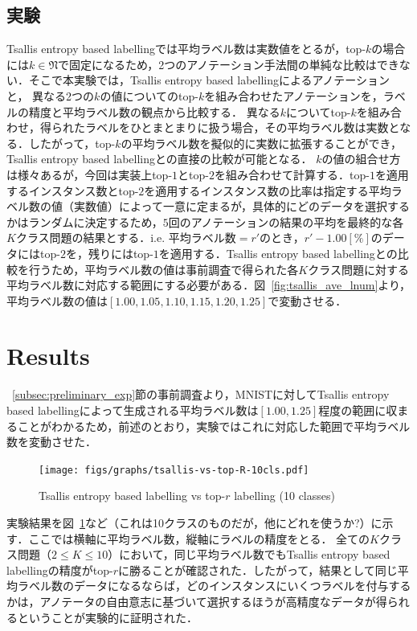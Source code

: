 \documentclass[a4paper,conference]{IEEEtran}
\begin{document}
\subsection{実験}\label{subsec:experiment}
Tsallis entropy based labellingでは平均ラベル数は実数値をとるが，top-$k$の場合には$k \in \mathfrak{N}$で固定になるため，2つのアノテーション手法間の単純な比較はできない．そこで本実験では，Tsallis entropy based labellingによるアノテーションと，
異なる2つの$k$の値についてのtop-$k$を組み合わせたアノテーションを，ラベルの精度と平均ラベル数の観点から比較する．
異なる$k$についてtop-$k$を組み合わせ，得られたラベルをひとまとまりに扱う場合，その平均ラベル数は実数となる．したがって，top-$k$の平均ラベル数を擬似的に実数に拡張することができ，Tsallis entropy based labellingとの直接の比較が可能となる．
$k$の値の組合せ方は様々あるが，今回は実装上top-$1$とtop-$2$を組み合わせて計算する．top-$1$を適用するインスタンス数とtop-$2$を適用するインスタンス数の比率は指定する平均ラベル数の値（実数値）によって一意に定まるが，具体的にどのデータを選択するかはランダムに決定するため，$5$回のアノテーションの結果の平均を最終的な各$K$クラス問題の結果とする．i.e. 平均ラベル数$ = r'$のとき，$r' - 1.00 [\%]$のデータにはtop-$2$を，残りにはtop-$1$を適用する．Tsallis entropy based labellingとの比較を行うため，平均ラベル数の値は事前調査で得られた各$K$クラス問題に対する平均ラベル数に対応する範囲にする必要がある．図~\ref{fig:tsallis_ave_lnum}より，平均ラベル数の値は$[1.00, 1.05, 1.10, 1.15, 1.20, 1.25]$で変動させる．

\section{Results}\label{sec:results}
~\ref{subsec:preliminary_exp}節の事前調査より，MNISTに対してTsallis entropy based labellingによって生成される平均ラベル数は$[1.00,  1.25]$程度の範囲に収まることがわかるため，前述のとおり，実験ではこれに対応した範囲で平均ラベル数を変動させた．

\begin{figure}[t]
\begin{center}
    \texttt{[image: figs/graphs/tsallis-vs-top-R-10cls.pdf]}
    \caption{Tsallis entropy based labelling vs top-$r$ labelling (10 classes)}
    \label{fig:exp_10cls}
\end{center}
\end{figure}

実験結果を図~\ref{fig:exp_10cls}など（これは10クラスのものだが，他にどれを使うか?）に示す．ここでは横軸に平均ラベル数，縦軸にラベルの精度をとる．
全ての$K$クラス問題（$2\leq K \leq 10$）において，同じ平均ラベル数でもTsallis entropy based labellingの精度がtop-$r$に勝ることが確認された．したがって，結果として同じ平均ラベル数のデータになるならば，どのインスタンスにいくつラベルを付与するかは，アノテータの自由意志に基づいて選択するほうが高精度なデータが得られるということが実験的に証明された．
\end{document}

